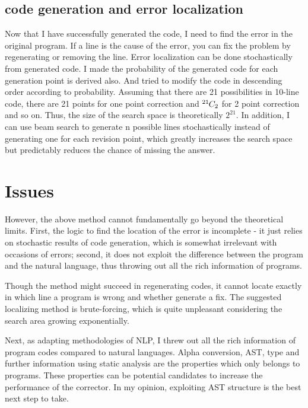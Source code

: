 \documentclass[nocopyrightspace]{sigplanconf}
\newcommand*{\permcomb}[4][0mu]{{{}^{#3}\mkern#1#2_{#4}}}
\newcommand*{\comb}[1][-1mu]{\permcomb[#1]{C}}
\begin{document}

\subsection{code generation and error localization}

Now that I have successfully generated the code, I need to find the error in the original program. If a line is the cause of the error, you can fix the problem by regenerating or removing the line. Error localization can be done stochastically from generated code. I made the probability of the generated code for each generation point is derived also. And tried to modify the code in descending order according to probability. Assuming that there are 21 possibilities in 10-line code, there are 21 points for one point correction and $ \comb{21}{2} $ for 2 point correction and so on. Thus, the size of the search space is theoretically $ 2^{21} $. In addition, I can use beam search to generate n possible lines stochastically instead of generating one for each revision point, which greatly increases the search space but predictably reduces the chance of missing the answer.

\section{Issues}

However, the above method cannot fundamentally go beyond the theoretical limits. First, the logic to find the location of the error is incomplete - it just relies on stochastic results of code generation, which is somewhat irrelevant with occasions of errors; second, it does not exploit the difference between the program and the natural language, thus throwing out all the rich information of programs.

Though the method might succeed in regenerating codes, it cannot locate exactly in which line a program is wrong and whether generate a fix. The suggested localizing method is brute-forcing, which is quite unpleasant considering the search area growing exponentially.

Next, as adapting methodologies of NLP, I threw out all the rich information of program codes compared to natural languages. Alpha conversion, AST\cite{mou2016convolutional}, type and further information using static analysis are the properties which only belongs to programs. These properties can be potential candidates to increase the performance of the corrector.
In my opinion, exploiting AST structure is the best next step to take.








\end{document}
